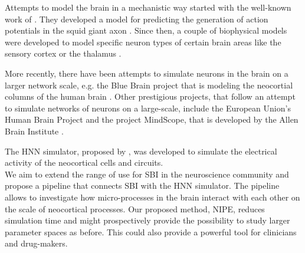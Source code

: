 \documentclass[12pt]{extreport}
\begin{document}

Attempts to model the brain in a mechanistic way started with the well-known work of \citet{hodgkin1952quantitative}. They developed a model for predicting the generation of action potentials in the squid giant axon \citep{hodgkin1952quantitative}. Since then, a couple of biophysical models were developed to model specific neuron types of certain brain areas like the sensory cortex or the thalamus \citep{einevoll2019scientific}.

More recently, there have been attempts to simulate neurons in the brain on a larger network scale, e.g. the Blue Brain project that is modeling the neocortial columns of the human brain \citep{schurmann2007blue}.
Other prestigious projects, that follow an attempt to simulate networks of neurons on a large-scale, include the European Union's Human Brain Project \citep{markram2011introducing} and the project MindScope, that is developed by the Allen Brain Institute \citep{einevoll2019scientific}.


The HNN simulator, proposed by \cite{neymotin2020human}, was developed to simulate the electrical activity of the neocortical cells and circuits. \\

We aim to extend the range of use for SBI in the neuroscience community and propose a pipeline that connects SBI with the HNN simulator.
The pipeline allows to investigate how micro-processes in the brain interact with each other on the scale of neocortical processes. Our proposed method, NIPE, reduces simulation time and might prospectively provide the possibility to study larger parameter spaces as before. 
This could also provide a powerful tool for clinicians and drug-makers. 
\end{document}
